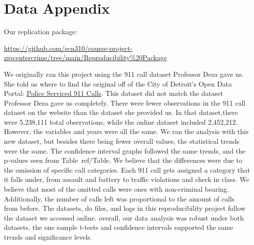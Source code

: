 \documentclass[12pt]{article}
\begin{document}
\newpage
\singlespacing
\setlength\bibsep{0pt}





\newpage
\section*{Data Appendix} \label{sec:appendixa}

Our replication package:

\href{https://github.com/ecn310/course-project-zipcentercrime/tree/main/Reproducibility%20Package}{https://github.com/ecn310/course-project-zipcentercrime/tree/main/Reproducibility\%20Package}

\vspace{10pt}


We originally ran this project using the 911 call dataset Professor Deza gave us. She told us where to find the original off of the City of Detroit's Open Data Portal: \href{https://data.detroitmi.gov/datasets/detroitmi::police-serviced-911-calls/about}{Police Serviced 911 Calls}. This dataset did not match the dataset Professor Deza gave us completely. There were fewer observations in the 911 call dataset on the website than the dataset she provided us. In that dataset,there were 5,238,111 total observations, while the online dataset included 2,452,212. However, the variables and years were all the same. We ran the analysis with this new dataset, but besides there being fewer overall values, the statistical trends were the same. The confidence interval graphs followed the same trends, and the p-values seen from Table~ref/{Table}. We believe that the differences were due to the omission of specific call categories. Each 911 call gets assigned a category that it falls under, from assault and battery to traffic violations and check in class. We believe that most of the omitted calls were ones with non-criminal bearing. Additionally, the number of calls left was proportional to the amount of calls from before. The datasets, do files, and logs in this reproducibility project follow the dataset we accessed online. overall, our data analysis was robust under both datasets. the one sample t-tests and confidence intervals supported the same trends and significance levels. 
\end{document}
